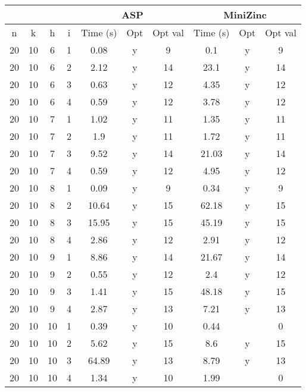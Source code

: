 \documentclass[12pt,a4paper,english,italian]{article}
\begin{document}
\begin{table}[]
	\begin{tabular}{cccc|ccc|ccc|}
		\cline{5-10}
		&    &    &   & \multicolumn{3}{c|}{ASP} & \multicolumn{3}{c|}{MiniZinc} \\ \hline
		n  & k  & h  & i & Time (s) & Opt & Opt val & Time (s)   & Opt   & Opt val  \\ \hline
		20 & 10 & 6  & 1 & 0.08     & y   & 9       & 0.1        & y     & 9        \\ \hline
		20 & 10 & 6  & 2 & 2.12     & y   & 14      & 23.1       & y     & 14       \\ \hline
		20 & 10 & 6  & 3 & 0.63     & y   & 12      & 4.35       & y     & 12       \\ \hline
		20 & 10 & 6  & 4 & 0.59     & y   & 12      & 3.78       & y     & 12       \\ \hline
		20 & 10 & 7  & 1 & 1.02     & y   & 11      & 1.35       & y     & 11       \\ \hline
		20 & 10 & 7  & 2 & 1.9      & y   & 11      & 1.72       & y     & 11       \\ \hline
		20 & 10 & 7  & 3 & 9.52     & y   & 14      & 21.03      & y     & 14       \\ \hline
		20 & 10 & 7  & 4 & 0.59     & y   & 12      & 4.95       & y     & 12       \\ \hline
		20 & 10 & 8  & 1 & 0.09     & y   & 9       & 0.34       & y     & 9        \\ \hline
		20 & 10 & 8  & 2 & 10.64    & y   & 15      & 62.18      & y     & 15       \\ \hline
		20 & 10 & 8  & 3 & 15.95    & y   & 15      & 45.19      & y     & 15       \\ \hline
		20 & 10 & 8  & 4 & 2.86     & y   & 12      & 2.91       & y     & 12       \\ \hline
		20 & 10 & 9  & 1 & 8.86     & y   & 14      & 21.67      & y     & 14       \\ \hline
		20 & 10 & 9  & 2 & 0.55     & y   & 12      & 2.4        & y     & 12       \\ \hline
		20 & 10 & 9  & 3 & 1.41     & y   & 15      & 48.18      & y     & 15       \\ \hline
		20 & 10 & 9  & 4 & 2.87     & y   & 13      & 7.21       & y     & 13       \\ \hline
		20 & 10 & 10 & 1 & 0.39     & y   & 10      & 0.44       &       & 0        \\ \hline
		20 & 10 & 10 & 2 & 5.62     & y   & 15      & 8.6        & y     & 15       \\ \hline
		20 & 10 & 10 & 3 & 64.89    & y   & 13      & 8.79       & y     & 13       \\ \hline
		20 & 10 & 10 & 4 & 1.34     & y   & 10      & 1.99       &       & 0        \\ \hline
	\end{tabular}
\end{table}
\end{document}
